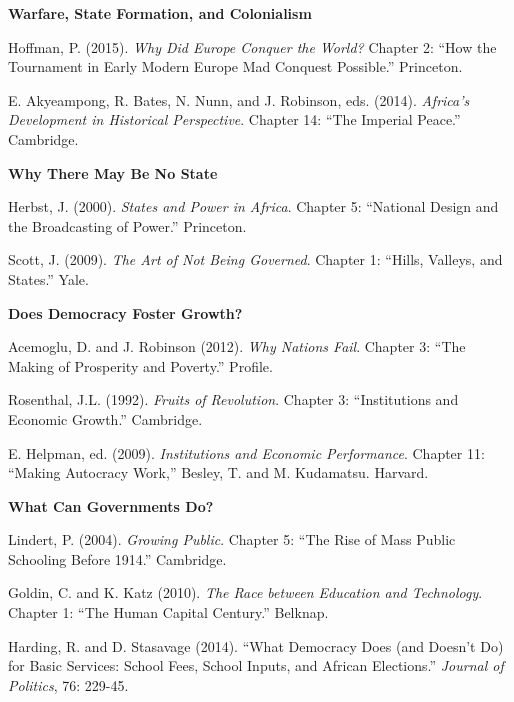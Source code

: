 \documentclass[letterpaper]{article}
\renewenvironment{itemize}{
  \begin{list}{}{
    \setlength{\leftmargin}{1.5em}
  }
}{
  \end{list}
}
\begin{document}
\begin{enumerate}
\item {\bf Warfare, State Formation, and Colonialism}
	\begin{itemize}
		\item[$\bullet$] Hoffman, P. (2015). \emph{Why Did Europe Conquer the World?} Chapter 2: ``How the Tournament in Early Modern Europe Mad Conquest Possible.'' Princeton.
		\item[$\bullet$] E. Akyeampong, R. Bates, N. Nunn, and J. Robinson, eds. (2014). \emph{Africa’s Development in Historical Perspective}. Chapter 14: ``The Imperial Peace.'' Cambridge.
	\end{itemize}


\item {\bf Why There May Be No State}
	\begin{itemize}
		\item[$\bullet$] Herbst, J. (2000). \emph{States and Power in Africa}. Chapter 5: ``National Design and the Broadcasting of Power.'' Princeton.
		\item[$\bullet$] Scott, J. (2009). \emph{The Art of Not Being Governed}. Chapter 1: ``Hills, Valleys, and States.'' Yale.
	\end{itemize}


\item {\bf Does Democracy Foster Growth?}
	\begin{itemize}
		\item[$\bullet$] Acemoglu, D. and J. Robinson (2012). \emph{Why Nations Fail}. Chapter 3: ``The Making of Prosperity and Poverty.'' Profile.
		\item[$\bullet$] Rosenthal, J.L. (1992). \emph{Fruits of Revolution}. Chapter 3: ``Institutions and Economic Growth.'' Cambridge.
		\item[$\bullet$] E. Helpman, ed. (2009). \emph{Institutions and Economic Performance}. Chapter 11: ``Making Autocracy Work,'' Besley, T. and M. Kudamatsu. Harvard.
	\end{itemize}



\item {\bf What Can Governments Do?}
	\begin{itemize}
		\item[$\bullet$] Lindert, P. (2004). \emph{Growing Public}. Chapter 5: ``The Rise of Mass Public Schooling Before 1914.'' Cambridge.
		\item[$\bullet$] Goldin, C. and K. Katz (2010). \emph{The Race between Education and Technology}. Chapter 1: ``The Human Capital Century.'' Belknap.
		\item[$\bullet$] Harding, R. and D. Stasavage (2014). ``What Democracy Does (and Doesn’t Do) for Basic Services: School Fees, School Inputs, and African Elections.'' \emph{Journal of Politics}, 76: 229-45.
	\end{itemize}



\end{enumerate}
\end{document}
